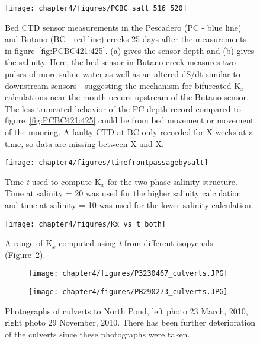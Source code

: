 \begin{figure}
	\texttt{[image: chapter4/figures/PCBC\_salt\_516\_520]}
	\caption{Bed CTD sensor measurements in the Pescadero (PC - blue line) and Butano (BC - red line) creeks 25 days after the measurements in figure~\ref{fig:PCBC421:425}. (a) gives the sensor depth and (b) gives the salinity. Here, the bed sensor in Butano creek measures two pulses of more saline water as well as an altered dS/dt similar to downstream sensors - suggesting the mechanism for bifurcated K$_x$ calculations near the mouth occurs upstream of the Butano sensor. The less truncated behavior of the PC depth record compared to figure~\ref{fig:PCBC421:425} could be from bed movement or movement of the mooring. A faulty CTD at BC only recorded for X weeks at a time, so data are missing between X and X.}  \label{fig:PCBC511:516}
\end{figure}


\begin{figure}
\centering
	\texttt{[image: chapter4/figures/timefrontpassagebysalt]}
	\caption{Time \emph{t} used to compute K$_x$ for the two-phase salinity structure. Time at salinity = 20 was used for the higher salinity calculation and time at salinity = 10 was used for the lower salinity calculation.}  \label{fig:tvsS}
\end{figure}



\begin{figure}
\centering
	\texttt{[image: chapter4/figures/Kx\_vs\_t\_both]}
	\caption{A range of K$_x$ computed using \emph{t} from different isopycnals (Figure~\ref{fig:tvsS}).}  \label{fig:Kxvst}
\end{figure}



\begin{figure}
\centering
\begin{subfigure}{.48\textwidth}
	\texttt{[image: chapter4/figures/P3230467\_culverts.JPG]}
\end{subfigure}
\begin{subfigure}{.48\textwidth}
	\texttt{[image: chapter4/figures/PB290273\_culverts.JPG]}
\end{subfigure}
\caption{Photographs of culverts to North Pond, left photo 23 March, 2010, right photo 29 November, 2010. There has been further deterioration of the culverts since these photographs were taken.} \label{fig:photoCulverts}
\end{figure}



